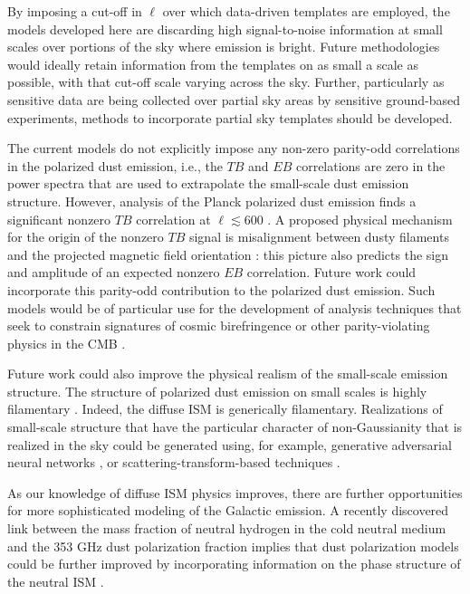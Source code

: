 \documentclass[twocolumn]{aastex631}
\begin{document}
By imposing a cut-off in $\ell$ over which data-driven templates are employed, the models developed here are discarding high signal-to-noise information at small scales over portions of the sky where emission is bright. Future methodologies would ideally retain information from the templates on as small a scale as possible, with that cut-off scale varying across the sky. Further, particularly as sensitive data are being collected over partial sky areas by sensitive ground-based experiments, methods to incorporate partial sky templates should be developed.

The current models do not explicitly impose any non-zero parity-odd correlations in the polarized dust emission, i.e., the $TB$ and $EB$ correlations are zero in the power spectra that are used to extrapolate the small-scale dust emission structure. However, analysis of the Planck polarized dust emission finds a significant nonzero $TB$ correlation at $\ell \lesssim 600$ \citep{planck2016-l11A, Weiland:2020}. A proposed physical mechanism for the origin of the nonzero $TB$ signal is misalignment between dusty filaments and the projected magnetic field orientation \citep{Huffenberger:2020, Clark:2021, Cukierman:2023}: this picture also predicts the sign and amplitude of an expected nonzero $EB$ correlation. Future work could incorporate this parity-odd contribution to the polarized dust emission. Such models would be of particular use for the development of analysis techniques that seek to constrain signatures of cosmic birefringence or other parity-violating physics in the CMB \citep[e.g.,][]{Minami:2020, Eskilt:2022}.

Future work could also improve the physical realism of the small-scale emission structure. The structure of polarized dust emission on small scales is highly filamentary \citep[e.g.,][]{Clark:2015, Halal:2024}. Indeed, the diffuse ISM is generically filamentary. %
Realizations of small-scale structure that have the particular character of non-Gaussianity that is realized in the sky could be generated using, for example, generative adversarial neural networks \citep{Krachmalnicoff:2021}, or scattering-transform-based techniques \citep{Regaldo-SaintBlancard:2020}.

As our knowledge of diffuse ISM physics improves, there are further opportunities for more sophisticated modeling of the Galactic emission. A recently discovered link between the mass fraction of neutral hydrogen in the cold neutral medium and the 353 GHz dust polarization fraction implies that dust polarization models could be further improved by incorporating information on the phase structure of the neutral ISM \citep{Lei:2024}. %
\end{document}
